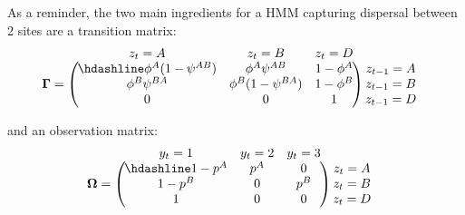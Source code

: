 \documentclass[
  12pt,
]{krantz}
\begin{document}
As a reminder, the two main ingredients for a HMM capturing dispersal between 2 sites are a transition matrix:
\[\begin{matrix}
& \\
\mathbf{\Gamma} =
\left ( \vphantom{ \begin{matrix} 12 \\ 12 \\ 12 \end{matrix} } \right .
\end{matrix}
\hspace{-1.2em}
\begin{matrix}
z_t=A & z_t=B & z_t=D \\ \hdashline
\phi^A (1-\psi^{AB}) & \phi^A \psi^{AB} & 1 - \phi^A\\
\phi^B \psi^{BA} & \phi^B (1-\psi^{BA}) & 1 - \phi^B\\
0 & 0 & 1
\end{matrix}
\hspace{-0.2em}
\begin{matrix}
& \\
\left . \vphantom{ \begin{matrix} 12 \\ 12 \\ 12 \end{matrix} } \right )
\begin{matrix}
z_{t-1}=A \\ z_{t-1}=B \\ z_{t-1}=D
\end{matrix}
\end{matrix}\]

and an observation matrix:
\[\begin{matrix}
& \\
\mathbf{\Omega} =
\left ( \vphantom{ \begin{matrix} 12 \\ 12 \\ 12 \end{matrix} } \right .
\end{matrix}
\hspace{-1.2em}
\begin{matrix}
y_t=1 & y_t=2 & y_t=3 \\ \hdashline
1 - p^A & p^A & 0\\
1 - p^B & 0 & p^B\\
1 & 0 & 0
\end{matrix}
\hspace{-0.2em}
\begin{matrix}
& \\
\left . \vphantom{ \begin{matrix} 12 \\ 12 \\ 12 \end{matrix} } \right )
\begin{matrix}
z_{t}=A \\ z_{t}=B \\ z_{t}=D
\end{matrix}
\end{matrix}\]
\end{document}
